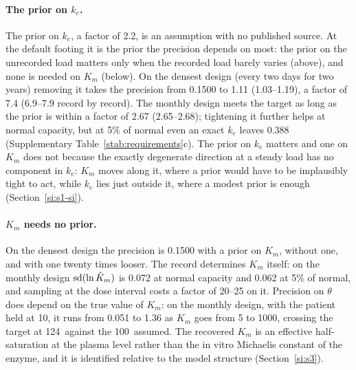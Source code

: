 \paragraph{The prior on $k_e$.} The prior on $k_e$, a factor of 2.2, is an assumption with no
published source. At the default footing it is the prior the precision depends on most: the prior
on the unrecorded load matters only when the recorded load barely varies (above), and none is
needed on $K_m$ (below). On the densest design (every two days
for two years) removing it takes the precision from 0.1500 to 1.11 (1.03--1.19), a factor of 7.4
(6.9--7.9 record by record). The monthly design meets the target as long as the prior is within a
factor of 2.67 (2.65--2.68); tightening it further helps at normal capacity, but at 5\% of normal
even an exact $k_e$ leaves 0.388 (Supplementary Table~\ref{stab:requirements}c). The prior on
$k_e$ matters and one on $K_m$ does not because the exactly degenerate direction at a steady load
has no component in $k_e$: $K_m$ moves along it, where a prior would have to be implausibly tight
to act, while $k_e$ lies just outside it, where a modest prior is enough (Section~\ref{si:s1-si}).

\paragraph{$K_m$ needs no prior.} On the densest design the precision is 0.1500 with a prior on
$K_m$, without one, and with one twenty times looser. The record determines $K_m$ itself: on the
monthly design $\operatorname{sd}(\ln \hat K_m)$ is 0.072 at normal capacity and 0.062 at 5\% of normal, and
sampling at the dose interval costs a factor of 20--25 on it. Precision on $\theta$ does depend on
the true value of $K_m$: on the monthly design, with the patient held at 10\uM, it runs from
0.051 to 1.36 as $K_m$ goes from 5 to 1000\uM, crossing the target at 124\uM\ against the 100\uM\
assumed. The recovered $K_m$ is an effective half-saturation at the plasma level rather than the
in vitro Michaelis constant of the enzyme, and it is identified relative to the model structure
(Section~\ref{si:s3}).

